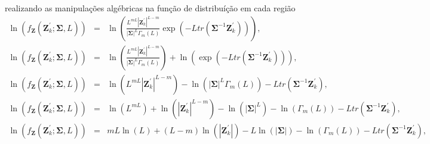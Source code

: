 realizando as manipulações algébricas na função de distribuíção em cada região
\begin{equation*}
\begin{array}{ccc}
	\ln{\left(f_{\mathbf{Z}}(\mathbf{Z}_{k}^{'};\mathbf{\Sigma},L)\right)}&=&\ln{\left(\frac{L^{mL}|\mathbf{Z}_{k}^{'}|^{L-m}}{|\mathbf{\Sigma}|^{L}\Gamma_m(L)} \exp(-L tr(\mathbf{\Sigma}^{-1}\mathbf{Z}_{k}^{'}))\right)}, \\
	\ln{\left(f_{\mathbf{Z}}(\mathbf{Z}_{k}^{'};\mathbf{\Sigma},L)\right)}&=&\ln{\left(\frac{L^{mL}|\mathbf{Z}_{k}^{'}|^{L-m}}{|\mathbf{\Sigma}|^{L}\Gamma_m(L)}\right)}+\ln{\left(\exp(-L tr(\mathbf{\Sigma}^{-1}\mathbf{Z}_{k}^{'}))\right)}, \\
	\ln{\left(f_{\mathbf{Z}}(\mathbf{Z}_{k}^{'};\mathbf{\Sigma},L)\right)}&=&\ln{\left(L^{mL}|\mathbf{Z}_{k}^{'}|^{L-m}\right)}- \ln{\left(|\mathbf{\Sigma}|^{L}\Gamma_m(L)\right)}-L tr(\mathbf{\Sigma}^{-1}\mathbf{Z}_{k}^{'}), \\
	\ln{\left(f_{\mathbf{Z}}(\mathbf{Z}_{k}^{'};\mathbf{\Sigma},L)\right)}&=&\ln{\left(L^{mL}\right)}+\ln{\left(|\mathbf{Z}_{k}^{'}|^{L-m}\right)}- \ln{\left(|\mathbf{\Sigma}|^{L}\right)}-\ln{\left(\Gamma_m(L)\right)}-L tr(\mathbf{\Sigma}^{-1}\mathbf{Z}_{k}^{'}), \\
	\ln{\left(f_{\mathbf{Z}}(\mathbf{Z}_{k}^{'};\mathbf{\Sigma},L)\right)}&=&mL\ln{\left(L\right)}+(L-m)\ln{\left(|\mathbf{Z}_{k}^{'}|\right)}- L\ln{\left(|\mathbf{\Sigma}|\right)}-\ln{\left(\Gamma_m(L)\right)}-L tr(\mathbf{\Sigma}^{-1}\mathbf{Z}_{k}^{'}), \\
\end{array}
\end{equation*}

